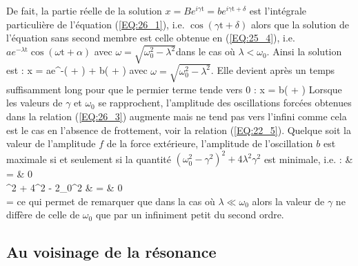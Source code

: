 De fait, la partie r\'{e}elle de la solution $x = Be^{i\gamma\mathrm{t}} = be^{i\gamma\mathrm{t} + \delta}$ est l'int\'{e}grale particuli\`{e}re de l'\'{e}quation (\ref{EQ:26_1}), i.e. $\cos(\gamma\mathrm{t} + \delta)$ alors que la solution de l'\'{e}quation sans second membre est celle obtenue en (\ref{EQ:25_4}), i.e. $ae^{-\lambda\mathrm{t}}\cos(\omega\mathrm{t} + \alpha)$ avec $\omega = \sqrt{\omega_{0}^{2} - \lambda^{2}}$dans le cas o\`{u} $\lambda < \omega_{0}$. Ainsi la solution est :
\be
	x = ae^{-\lambda{}}\cos(\omega{} + \alpha) + b\cos(\gamma{} + \delta) \label{EQ:26_4}
\ee
avec $\omega = \sqrt{\omega_{0}^{2} - \lambda^{2}}$. Elle devient après un temps suffisamment long pour que le permier terme tende vers 0 :
\be
	x = b\cos(\gamma{} + \delta) \label{EQ:26_5}
\ee
Lorsque les valeurs de $\gamma$ et $\omega_{0}$ se rapprochent, l'amplitude des oscillations forc\'{e}es obtenues dans la relation (\ref{EQ:26_3}) augmente mais ne tend pas vers l'infini comme cela est le cas en l'absence de frottement, voir la relation (\ref{EQ:22_5}). Quelque soit la valeur de l'amplitude $f$ de la force ext\'{e}rieure, l'amplitude de l'oscillation $b$ est maximale si et seulement si la quantit\'{e} $(\omega_{0}^{2} - \gamma^{2})^{2} + 4\lambda^{2}\gamma^{2}$ est minimale, i.e. :
\bea
	 & = & 0 \nonumber \\
	\gamma^{2} + 4\lambda^{2} - 2\omega_{0}^{2} & = & 0 \nonumber \\
	\Leftrightarrow \gamma =  \nonumber
\eea
ce qui permet de remarquer que dans la cas o\`{u} $\lambda \ll \omega_{0}$ alors la valeur de $\gamma$ ne diff\`{e}re de celle de $\omega_{0}$ que par un infiniment petit du second ordre.

\subsection{Au voisinage de la r\'{e}sonance}

